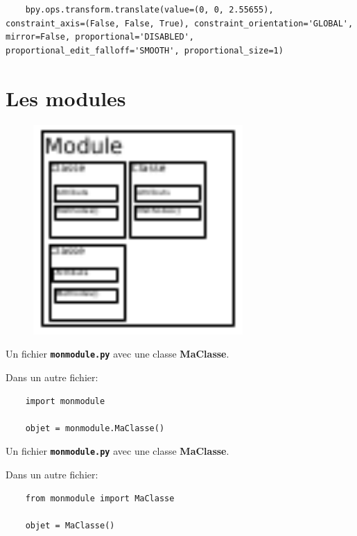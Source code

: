 \documentclass[11pt,usenames,dvipsnames]{beamer}
\begin{document}
\begin{frame}[fragile]
  \begin{lstlisting}
    bpy.ops.transform.translate(value=(0, 0, 2.55655), constraint_axis=(False, False, True), constraint_orientation='GLOBAL', mirror=False, proportional='DISABLED', proportional_edit_falloff='SMOOTH', proportional_size=1)
  \end{lstlisting}
\end{frame}



\section{Les modules}
\begin{frame}
\begin{figure}
  \begin{center}
    \includegraphics[width=8cm]{module.pdf}
  \end{center}
\end{figure}
\end{frame}

\begin{frame}[fragile]
Un fichier \textbf{\texttt{monmodule.py}} avec une classe \textbf{MaClasse}.

Dans un autre fichier:
  \begin{lstlisting}
    import monmodule
    
    objet = monmodule.MaClasse()
  \end{lstlisting}
\end{frame}

\begin{frame}[fragile]
Un fichier \textbf{\texttt{monmodule.py}} avec une classe \textbf{MaClasse}.

Dans un autre fichier:
  \begin{lstlisting}
    from monmodule import MaClasse
    
    objet = MaClasse()
  \end{lstlisting}
\end{frame}
\end{document}
